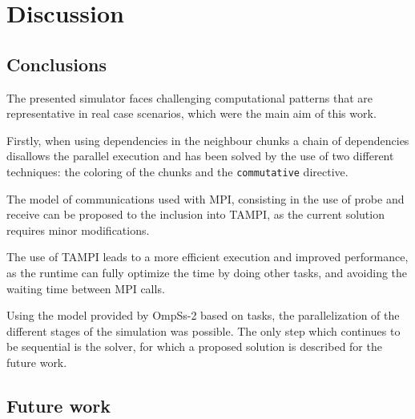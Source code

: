 \chapter{Discussion}
\label{ch:discussion}


\section{Conclusions}

The presented simulator faces challenging computational patterns that are 
representative in real case scenarios, which were the main aim of this work. 

Firstly, when using dependencies in the neighbour chunks a chain of dependencies 
disallows the parallel execution and has been solved by the use of two different 
techniques: the coloring of the chunks and the \texttt{commutative} directive.

The model of communications used with MPI, consisting in the use of probe and 
receive can be proposed to the inclusion into TAMPI, as the current solution 
requires minor modifications.

The use of TAMPI leads to a more efficient execution and improved performance, 
as the runtime can fully optimize the time by doing other tasks, and avoiding 
the waiting time between MPI calls.

Using the model provided by OmpSs-2 based on tasks, the parallelization of the 
different stages of the simulation was possible. The only step which continues 
to be sequential is the solver, for which a proposed solution is described for 
the future work.

\section{Future work}

